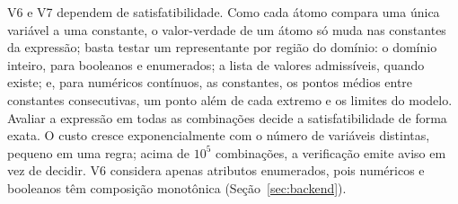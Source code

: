 \documentclass[conference]{IEEEtran}
\begin{document}
V6 e V7 dependem de satisfatibilidade. Como cada átomo compara uma única
variável a uma constante, o valor-verdade de um átomo só muda nas constantes
da expressão; basta testar um representante por região do domínio: o domínio
inteiro, para booleanos e enumerados; a lista de valores admissíveis, quando
existe; e, para numéricos contínuos, as constantes, os pontos médios entre
constantes consecutivas, um ponto além de cada extremo e os limites do modelo.
Avaliar a expressão em todas as combinações decide a satisfatibilidade de forma
exata. O custo cresce exponencialmente com o número de variáveis distintas,
pequeno em uma regra; acima de $10^5$ combinações, a verificação emite aviso em
vez de decidir. V6 considera apenas atributos enumerados, pois numéricos e
booleanos têm composição monotônica (Seção~\ref{sec:backend}).
\end{document}
